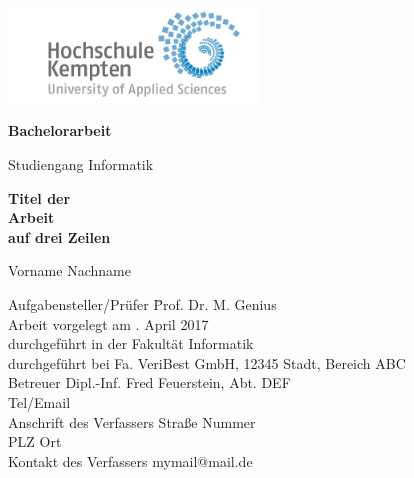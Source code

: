 \thispagestyle{empty}



\vspace*{-20mm}
\begin{flushright}
\includegraphics[width=0.5\textwidth]{Bilder/LogoHS.png}
\end{flushright}


\vspace*{2cm}

\begin{center}
{\Large \textbf{Bachelorarbeit}}\\ 

\vspace*{1cm}

{\large Studiengang Informatik\\[1mm]}

\vspace{1cm}

{\Large \bfseries Titel der\\ 
	Arbeit\\
	auf drei Zeilen\\}


\vspace{1.5cm}

{\large Vorname Nachname}\\[40mm]

\end{center}

\vfill

\parbox{120mm}{
\begin{tabbing}
Aufgabensteller/Prüfer \hspace{.7cm} \= Prof. Dr. M. Genius\\
Arbeit vorgelegt am                  . April 2017\\
durchgeführt in der                  \> Fakultät Informatik\\[4mm]
durchgeführt bei                     \> Fa. VeriBest GmbH, 12345 Stadt, Bereich ABC\\
Betreuer                             \> Dipl.-Inf. Fred Feuerstein, Abt. DEF\\
                                     \> Tel/Email\\[4mm]
Anschrift des Verfassers             \> Straße Nummer\\
                                     \> PLZ Ort\\
Kontakt des Verfassers               \> mymail@mail.de\\
\end{tabbing}
}

